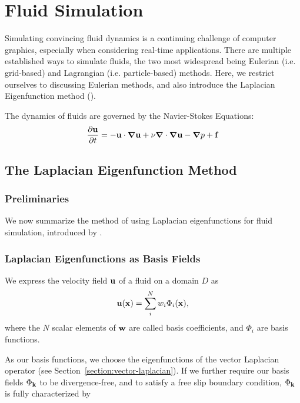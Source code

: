 \chapter{Fluid Simulation}
Simulating convincing fluid dynamics is a continuing challenge of computer
graphics, especially when considering real-time applications. There are multiple
established ways to simulate fluids, the two most widespread being Eulerian
(i.e. grid-based) and Lagrangian (i.e. particle-based) methods. Here, we
restrict ourselves to discussing Eulerian methods, and also introduce the
Laplacian Eigenfunction method (\cite{dewitt}).

The dynamics of fluids are governed by the Navier-Stokes Equations:
\begin{equation}
    \label{eq:NSE}
    \begin{aligned}
        \pdv{\vb{u}}{t} = -\vb{u}\cdot\grad{\vb{u}} + 
        \nu \grad\cdot\grad \vb{u} - \grad{p} + \vb{f}
    \end{aligned}
\end{equation}

\section{The Laplacian Eigenfunction Method}
\subsection{Preliminaries}
We now summarize the method of using Laplacian eigenfunctions for fluid
simulation, introduced by \citet{dewitt}.

\subsection*{Laplacian Eigenfunctions as Basis Fields}
We express the velocity field $\vb{u}$ of a fluid on a domain $D$ as
$$\vb{u}(\vb{x})=\sum_i^N w_i \Phi_i(\vb{x}),$$
where the $N$ scalar elements of $\vb{w}$ are called basis coefficients, and
${\Phi_i}$ are basis functions.

As our basis functions, we choose the eigenfunctions of the vector Laplacian
operator (see Section~\ref{section:vector-laplacian}). If we further require our
basis fields $\Phi_{\vb{k}}$ to be divergence-free, and to satisfy a free slip
boundary condition, $\Phi_{\vb{k}}$ is fully characterized by

